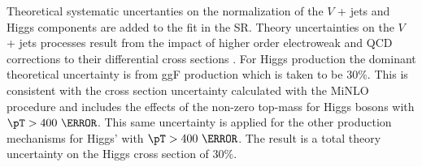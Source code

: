 Theoretical systematic uncertanties on the normalization of the $V$ + jets and
Higgs components are added to the fit in the SR.  Theory uncertainties on the
$V$ + jets processes result from the impact of higher order electroweak and QCD
corrections to their differential cross sections \cite{Lindert:2017olm}. For
Higgs production the dominant theoretical uncertainty is from ggF production
which is taken to be $30\%$.  This is consistent with the cross section
uncertainty calculated with the MiNLO procedure and includes the effects of the
non-zero top-mass for Higgs bosons with $\pT > 400~\GeV$.  This same
uncertainty is applied for the other production mechanisms for Higgs' with
$\pT > 400~\GeV$.  The result is a total theory uncertainty on the Higgs
cross section of $30\%$.

